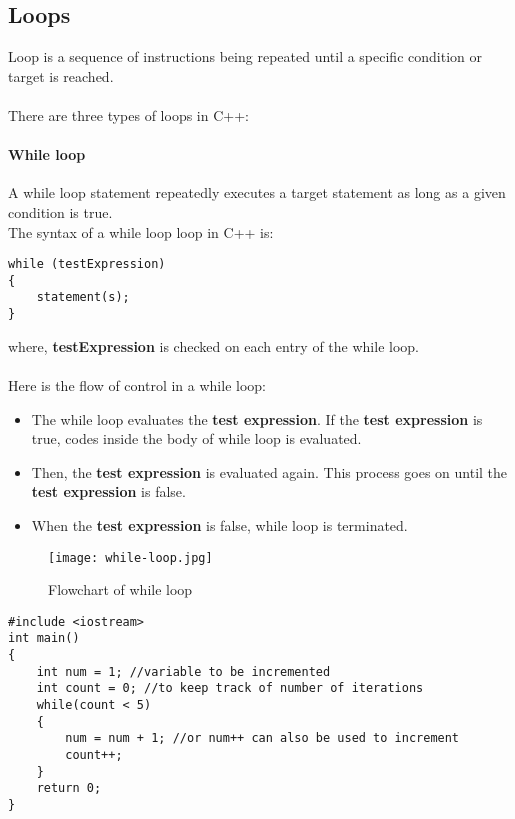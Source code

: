 \documentclass[11pt,fleqn]{book} %
\begin{document}
\subsection{Loops}
Loop is a sequence of instructions being repeated until a specific condition or target is reached. ~\\ ~\\
There are three types of loops in C++: \\
\paragraph{While loop}
A while loop statement repeatedly executes a target statement as long as a given condition is true. ~\\
The syntax of a while loop loop in C++ is:
\begin{lstlisting}
while (testExpression) 
{
	statement(s);
}
\end{lstlisting}
where, \textbf{testExpression} is checked on each entry of the while loop.
~\\ \\
Here is the flow of control in a while loop: \\
\begin{itemize}
\item The while loop evaluates the \textbf{test expression}.
If the \textbf{test expression} is true, codes inside the body of while loop is evaluated.
\item Then, the \textbf{test expression} is evaluated again. This process goes on until the \textbf{test expression} is false.
\item When the \textbf{test expression} is false, while loop is terminated.
\end{itemize}
\begin{figure}[H]
	\centering
	\texttt{[image: while-loop.jpg]}
	\caption{Flowchart of while loop}
\end{figure}
\begin{example}
	\begin{lstlisting}[title={Using While loop to increment an integer 5 times}, captionpos=b]
#include <iostream>
int main()
{
	int num = 1; //variable to be incremented
	int count = 0; //to keep track of number of iterations
	while(count < 5)
	{
		num = num + 1; //or num++ can also be used to increment
		count++;
	}
	return 0;
}
\end{lstlisting}
\end{example}
\end{document}
